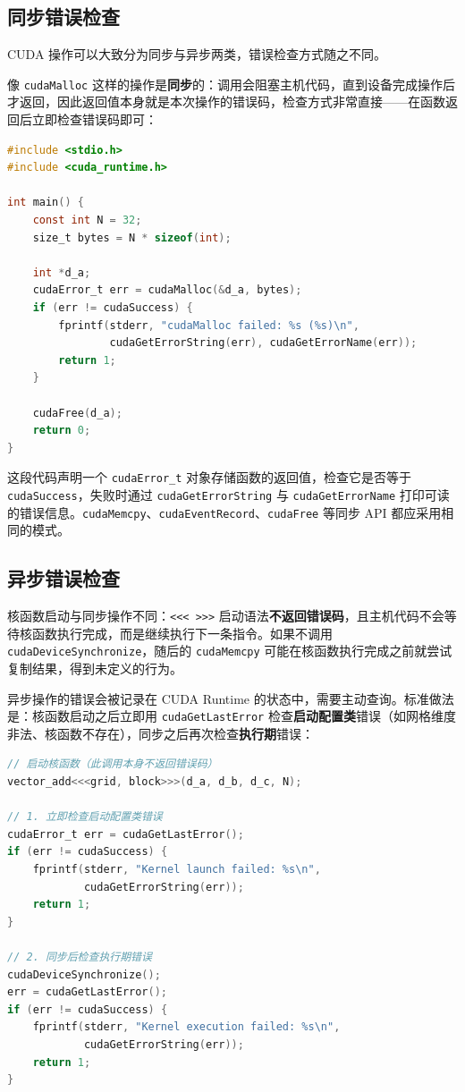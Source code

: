 \subsection{同步错误检查}

CUDA 操作可以大致分为同步与异步两类，错误检查方式随之不同。

像 \texttt{cudaMalloc} 这样的操作是\textbf{同步}的：调用会阻塞主机代码，直到设备完成操作后才返回，因此返回值本身就是本次操作的错误码，检查方式非常直接——在函数返回后立即检查错误码即可：

\begin{lstlisting}[language=C]
#include <stdio.h>
#include <cuda_runtime.h>

int main() {
    const int N = 32;
    size_t bytes = N * sizeof(int);

    int *d_a;
    cudaError_t err = cudaMalloc(&d_a, bytes);
    if (err != cudaSuccess) {
        fprintf(stderr, "cudaMalloc failed: %s (%s)\n",
                cudaGetErrorString(err), cudaGetErrorName(err));
        return 1;
    }

    cudaFree(d_a);
    return 0;
}
\end{lstlisting}

这段代码声明一个 \texttt{cudaError\_t} 对象存储函数的返回值，检查它是否等于 \texttt{cudaSuccess}，失败时通过 \texttt{cudaGetErrorString} 与 \texttt{cudaGetErrorName} 打印可读的错误信息。\texttt{cudaMemcpy}、\texttt{cudaEventRecord}、\texttt{cudaFree} 等同步 API 都应采用相同的模式。

\subsection{异步错误检查}

核函数启动与同步操作不同：\texttt{<<< >>>} 启动语法\textbf{不返回错误码}，且主机代码不会等待核函数执行完成，而是继续执行下一条指令。如果不调用 \texttt{cudaDeviceSynchronize}，随后的 \texttt{cudaMemcpy} 可能在核函数执行完成之前就尝试复制结果，得到未定义的行为。

异步操作的错误会被记录在 CUDA Runtime 的状态中，需要主动查询。标准做法是：核函数启动之后立即用 \texttt{cudaGetLastError} 检查\textbf{启动配置类}错误（如网格维度非法、核函数不存在），同步之后再次检查\textbf{执行期}错误：

\begin{lstlisting}[language=C]
// 启动核函数（此调用本身不返回错误码）
vector_add<<<grid, block>>>(d_a, d_b, d_c, N);

// 1. 立即检查启动配置类错误
cudaError_t err = cudaGetLastError();
if (err != cudaSuccess) {
    fprintf(stderr, "Kernel launch failed: %s\n",
            cudaGetErrorString(err));
    return 1;
}

// 2. 同步后检查执行期错误
cudaDeviceSynchronize();
err = cudaGetLastError();
if (err != cudaSuccess) {
    fprintf(stderr, "Kernel execution failed: %s\n",
            cudaGetErrorString(err));
    return 1;
}
\end{lstlisting}

